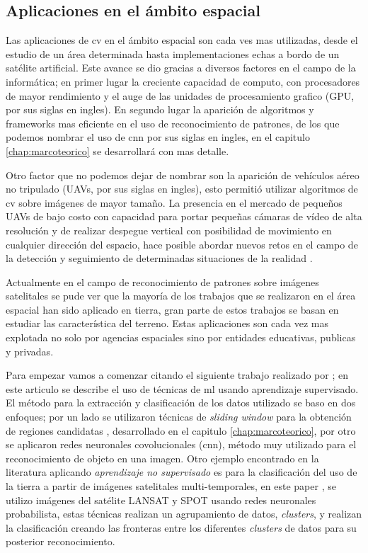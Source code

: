 \subsection{Aplicaciones en el ámbito espacial}\label{sub:estadodelacuestion}

Las aplicaciones de \ac{cv} en el ámbito espacial son cada ves mas utilizadas, desde el estudio de un área determinada hasta implementaciones echas a bordo de un satélite artificial. Este avance se dio gracias a diversos factores en el campo de la informática; en primer lugar la creciente capacidad de computo, con procesadores de mayor rendimiento y el auge de las unidades de procesamiento grafico (GPU, por sus siglas en ingles). En segundo lugar la aparición de algoritmos y frameworks mas eficiente en el uso de reconocimiento de patrones, de los que podemos nombrar el uso de \ac{cnn} por sus siglas en ingles, en el capitulo \ref{chap:marcoteorico} se desarrollará con mas detalle. 

Otro factor que no podemos dejar de nombrar son la aparición de vehículos aéreo no tripulado (UAVs, por sus siglas en ingles), esto permitió utilizar algoritmos de \ac{cv} sobre imágenes de mayor tamaño. La presencia en el mercado de pequeños UAVs de bajo costo con capacidad para portar pequeñas cámaras de vídeo de alta resolución y de realizar despegue vertical con posibilidad de movimiento en cualquier dirección del espacio, hace posible abordar nuevos retos en el campo de la detección y seguimiento de determinadas situaciones de la realidad \citep{Lanillos}.

Actualmente en el campo de reconocimiento de patrones sobre imágenes satelitales se pude ver que la mayoría de los trabajos que se realizaron en el área espacial han sido aplicado en tierra, gran parte de estos trabajos se basan en estudiar las característica del terreno. Estas aplicaciones son cada vez mas explotada no solo por agencias espaciales sino por entidades educativas, publicas y privadas. 

Para empezar vamos a comenzar citando el siguiente trabajo realizado por \citep{Cheang}; en este articulo se describe el uso de técnicas de \ac{ml} usando aprendizaje supervisado. El método para la extracción y clasificación de los datos utilizado se baso en dos enfoques; por un lado se utilizaron técnicas de \textit{sliding window}  \citep{sliding_windows} para la obtención de regiones candidatas , desarrollado en el capitulo \ref{chap:marcoteorico}, por otro se aplicaron redes neuronales covolucionales (\ac{cnn}), método muy utilizado para el reconocimiento de objeto en una imagen. Otro ejemplo encontrado en la literatura aplicando  \textit{aprendizaje no supervisado} es para la clasificación del uso de la tierra a partir de imágenes satelitales multi-temporales, en este paper \citep{pnn}, se utilizo imágenes del satélite LANSAT y SPOT usando redes neuronales probabilista, estas técnicas realizan un agrupamiento de datos, \textit{clusters}, y realizan la clasificación creando las fronteras entre los diferentes \textit{clusters} de datos para su posterior reconocimiento.

